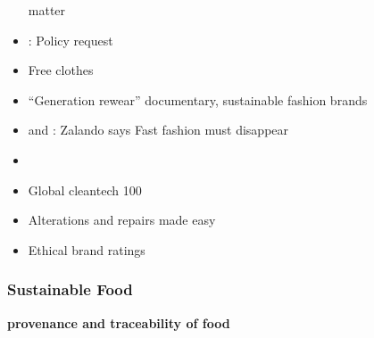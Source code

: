 \documentclass[
  letterpaper,
  DIV=11,
  numbers=noendperiod]{scrartcl}
\begin{document}
\begin{itemize}
  matter
\item
  \citet{textileexchangeFASHIONINDUSTRYTRADE2021}: Policy request
\item
  Free clothes
\item
  \citet{vanishukGENERATIONREWEARFull2021} ``Generation rewear''
  documentary, sustainable fashion brands
\item
  \citet{storbeckFastFashionMust2021} and
  \citet{remingtonZalandoZignLabel2020}: Zalando says Fast fashion must
  disappear
\item
  \citet{infinitedfiberInfinitedFiber2023}
\item
  \citet{cleantechgroupGlobalCleantech1002023} Global cleantech 100
\item
  \citet{SOJODoortodoorClothing2023} Alterations and repairs made easy
\item
  \citet{GoodYouSustainable2023} Ethical brand ratings
\end{itemize}

\subsubsection{Sustainable Food}\label{sustainable-food}

\textbf{provenance and traceability of food}
\end{document}

